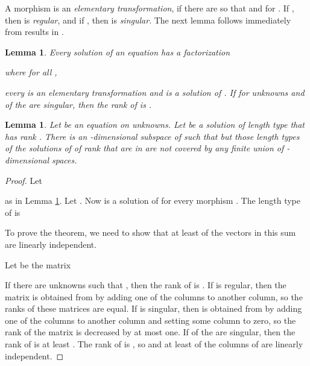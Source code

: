 \documentclass[submission]{eptcs}
\newtheorem{lemma}[theorem]{Lemma}
\theoremstyle{definition}
\begin{document}
A morphism  is an \emph{elementary
transformation}, if there are  so that  and  for .
If , then  is \emph{regular}, and if , then  is \emph{singular}. The next lemma follows
immediately from results in \cite{Lo83}.

\begin{lemma} \label{lem:elemtrans}
Every solution  of an equation  has a factorization

where  for all ,

every  is an elementary transformation and  is a solution of . If  for  unknowns
 and  of the  are singular, then the rank of  is .
\end{lemma}

\begin{lemma} \label{lem:rdim}
Let  be an equation on  unknowns. Let  be a solution of length type  that has rank . There
is an -dimensional subspace  of  such that  but
those length types of the solutions of  of rank  that are in
 are not covered by any finite union of -dimensional
spaces.
\end{lemma}
\begin{proof}
Let

as in Lemma \ref{lem:elemtrans}. Let . Now  is a solution of  for
every morphism . The length type of  is

To prove the theorem, we need to show that at least  of the
vectors in this sum are linearly independent.

Let  be the  matrix

If there are  unknowns  such that , then the
rank of  is . If  is regular, then the matrix
 is obtained from  by adding one of the columns to
another column, so the ranks of these matrices are equal. If
 is singular, then  is obtained from  by
adding one of the columns to another column and setting some column
to zero, so the rank of the matrix is decreased by at most one. If
 of the  are singular, then the rank of  is at least
. The rank of  is , so  and at
least  of the columns of  are linearly independent.
\end{proof}
\end{document}
